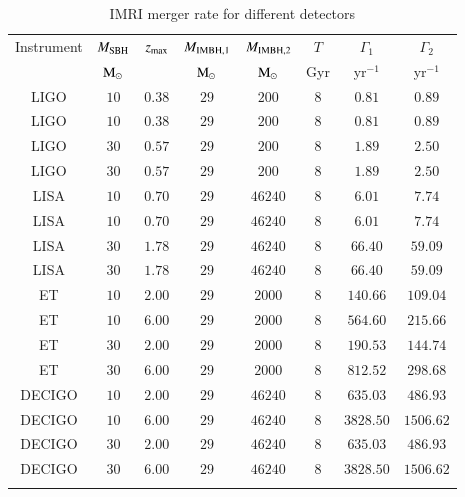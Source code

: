 \documentclass[article]{aa}
\newcommand{\Ms}{{\rm M}_\odot}
\newcommand{\ibh}{{\rm IMBH}}
\begin{document}
\begin{table}
\caption{IMRI merger rate for different detectors }
\begin{center}
\begin{tabular}{cccccccc}
\hline
Instrument & $M_{\rm SBH}$ & $z_{\rm max}$ & $M_{\ibh ,1}$ & $M_{\ibh ,2}$ & $T$ & $\Gamma_1$ & $\Gamma_2$ \\
   & $\Ms$ & &$\Ms$ & $\Ms$ & Gyr & yr$^{-1}$ & yr$^{-1}$ \\ 
\hline
LIGO & $10$ & $0.38$ & $29$ & $200$ & $8$ & $0.81$ &$0.89$ \\
LIGO & $10$ & $0.38$ & $29$ & $200$ & $8$ & $0.81$ &$0.89$ \\
LIGO & $30$ & $0.57$ & $29$ & $200$ & $8$ & $1.89$ &$2.50$ \\
LIGO & $30$ & $0.57$ & $29$ & $200$ & $8$ & $1.89$ &$2.50$ \\
LISA & $10$ & $0.70$ & $29$ & $46240$ & $8$ & $6.01$ &$7.74$ \\
LISA & $10$ & $0.70$ & $29$ & $46240$ & $8$ & $6.01$ &$7.74$ \\
LISA & $30$ & $1.78$ & $29$ & $46240$ & $8$ & $66.40$ &$59.09$ \\
LISA & $30$ & $1.78$ & $29$ & $46240$ & $8$ & $66.40$ &$59.09$ \\
ET & $10$ & $2.00$ & $29$ & $2000$ & $8$ & $140.66$ &$109.04$ \\
ET & $10$ & $6.00$ & $29$ & $2000$ & $8$ & $564.60$ &$215.66$ \\
ET & $30$ & $2.00$ & $29$ & $2000$ & $8$ & $190.53$ &$144.74$ \\
ET & $30$ & $6.00$ & $29$ & $2000$ & $8$ & $812.52$ &$298.68$ \\
DECIGO & $10$ & $2.00$ & $29$ & $46240$ & $8$ & $635.03$ &$486.93$ \\
DECIGO & $10$ & $6.00$ & $29$ & $46240$ & $8$ & $3828.50$ &$1506.62$ \\
DECIGO & $30$ & $2.00$ & $29$ & $46240$ & $8$ & $635.03$ &$486.93$ \\
DECIGO & $30$ & $6.00$ & $29$ & $46240$ & $8$ & $3828.50$ &$1506.62$ \\
\hline
\label{tab:5}
\end{tabular}
\end{center}
\end{table}
\end{document}
